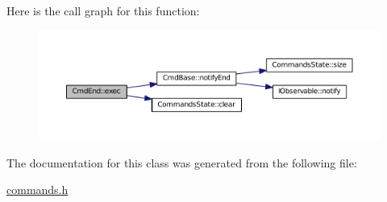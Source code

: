 Here is the call graph for this function\+:
\nopagebreak
\begin{figure}[H]
\begin{center}
\leavevmode
\includegraphics[width=350pt]{class_cmd_end_a4c316b96ae2a814838a4c985b8b551ab_cgraph}
\end{center}
\end{figure}




The documentation for this class was generated from the following file\+:\begin{DoxyCompactItemize}
\item 
\hyperlink{commands_8h}{commands.\+h}\end{DoxyCompactItemize}
